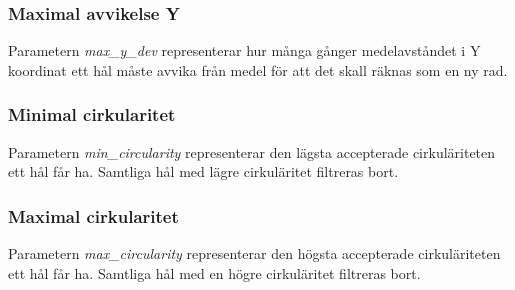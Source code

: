 \documentclass[a4paper]{article}
\begin{document}
	  \subsubsection{Maximal avvikelse Y}
	  	Parametern \textit{max\_y\_dev} representerar hur många gånger medelavståndet i Y koordinat ett hål måste avvika från medel för att det skall
		räknas som en ny rad.

	  \subsubsection{Minimal cirkularitet}
	    	Parametern \textit{min\_circularity} representerar den lägsta accepterade cirkuläriteten ett hål får ha. Samtliga hål med lägre cirkuläritet filtreras bort.
	  	
	  \subsubsection{Maximal cirkularitet}
	  	Parametern \textit{max\_circularity} representerar den högsta accepterade cirkuläriteten ett hål får ha. Samtliga hål med en högre cirkuläritet filtreras bort.
\end{document}
